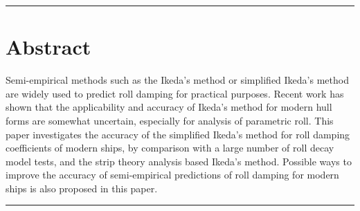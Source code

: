 {\footnotesize
\noindent\rule{\columnwidth}{0.4pt}
\section*{Abstract}\label{se:abstract}
Semi-empirical methods such as the Ikeda’s method or simplified Ikeda’s method are widely used to predict roll damping for practical purposes. Recent work has shown that the applicability and accuracy of Ikeda’s method for modern hull forms are somewhat uncertain, especially for analysis of parametric roll. 
This paper investigates the accuracy of the simplified Ikeda's method for roll damping coefficients of modern ships, by comparison with a large number of roll decay model tests, and the strip theory analysis based Ikeda's method. Possible ways to improve the accuracy of semi-empirical predictions of roll damping for modern ships is also proposed in this paper.

}
\newline
\noindent\rule{\columnwidth}{0.4pt}